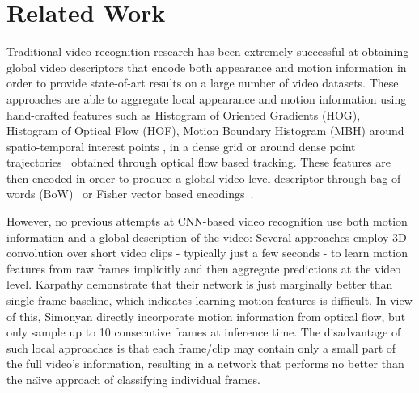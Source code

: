 \documentclass[10pt,twocolumn,letterpaper]{article}
\begin{document}
 \vspace{-.8em}
\section{Related Work}
\vspace{-1em}
\label{sec:related}



Traditional video recognition research has been extremely successful at obtaining
global video descriptors that encode both appearance and motion information in order to
 provide state-of-art results on a large number of video datasets. These approaches are able
to aggregate local appearance and motion information using hand-crafted features
such as Histogram of Oriented Gradients (HOG), Histogram of Optical
Flow (HOF), Motion Boundary Histogram (MBH) around spatio-temporal
interest points \cite{laptev-actions}, in a dense grid
\cite{Wang09evaluationof} or around dense point
trajectories~\cite{jain13,kuehne11,wang11,wang13} obtained through
optical flow based tracking. These features are then encoded in order
to produce a global video-level descriptor through bag of words
(BoW)~\cite{laptev-actions} or Fisher vector based
encodings~\cite{wang13}.

However, no previous attempts at CNN-based video recognition use both
motion information and a global description of the video: Several
approaches \cite{liris2011,ji2013,karpathy2014large} employ
3D-convolution over short video clips - typically just a few seconds -
to learn motion features from raw frames implicitly
and then aggregate predictions at the video level.
Karpathy \etal\cite{karpathy2014large} demonstrate that their network
is just marginally better than single frame baseline, which indicates
learning motion features is difficult.
In view of this, Simonyan
\etal \cite{simonyan2014two} directly incorporate motion information
from optical flow, but only sample up to 10 consecutive frames at
inference time. The disadvantage of such local approaches is that each
frame/clip may contain only a small part of the full video's
information, resulting in a network that performs no better than the
na\"{\i}ve approach of classifying individual frames.
\end{document}
